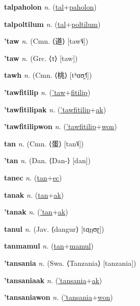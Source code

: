 \textbf{\hypertarget{talpaholon}{talpaholon}} \textit{n.} (\hyperlink{tal}{tal}+\allowbreak \hyperlink{paholon}{paholon})


\textbf{\hypertarget{talpoltilum}{talpoltilum}} \textit{n.} (\hyperlink{tal}{tal}+\allowbreak \hyperlink{poltilum}{poltilum})


\textbf{\hypertarget{'taw}{'taw}} \textit{n.} (Cmn. ⟨{\chinese{}道}⟩ [taw˥˩])


\textbf{\hypertarget{'taw}{'taw}} \textit{n.} (Grc. ⟨τ⟩ [taw])


\textbf{\hypertarget{tawh}{tawh}} \textit{n.} (Cmn. ⟨{\chinese{}桃}⟩ [tʰɑʊ̯˧˥])


\textbf{\hypertarget{'tawfitilip}{'tawfitilip}} \textit{n.} (\hyperlink{'taw}{'taw}+\allowbreak \hyperlink{fitilip}{fitilip})


\textbf{\hypertarget{'tawfitilipak}{'tawfitilipak}} \textit{n.} (\hyperlink{'tawfitilip}{'tawfitilip}+\allowbreak \hyperlink{ak}{ak})


\textbf{\hypertarget{'tawfitilipwon}{'tawfitilipwon}} \textit{n.} (\hyperlink{'tawfitilip}{'tawfitilip}+\allowbreak \hyperlink{won}{won})


\textbf{\hypertarget{tan}{tan}} \textit{n.} (Cmn. ⟨{\chinese{}蛋}⟩ [tan˥˩])


\textbf{\hypertarget{'tan}{'tan}} \textit{n.} (Dan. ⟨Dan-⟩ [dan])


\textbf{\hypertarget{tanec}{tanec}} \textit{n.} (\hyperlink{tan}{tan}+\allowbreak \hyperlink{ec}{ec})


\textbf{\hypertarget{tanak}{tanak}} \textit{n.} (\hyperlink{tan}{tan}+\allowbreak \hyperlink{ak}{ak})


\textbf{\hypertarget{'tanak}{'tanak}} \textit{n.} (\hyperlink{'tan}{'tan}+\allowbreak \hyperlink{ak}{ak})


\textbf{\hypertarget{tanul}{tanul}} \textit{n.} (Jav. ⟨dangur⟩ [tɑ̤ŋʊɽ])


\textbf{\hypertarget{tanmamul}{tanmamul}} \textit{n.} (\hyperlink{tan}{tan}+\allowbreak \hyperlink{mamul}{mamul})


\textbf{\hypertarget{'tansania}{'tansania}} \textit{n.} (Swa. ⟨Tanzania⟩ [tanzania])


\textbf{\hypertarget{'tansaniaak}{'tansaniaak}} \textit{n.} (\hyperlink{'tansania}{'tansania}+\allowbreak \hyperlink{ak}{ak})


\textbf{\hypertarget{'tansaniawon}{'tansaniawon}} \textit{n.} (\hyperlink{'tansania}{'tansania}+\allowbreak \hyperlink{won}{won})


